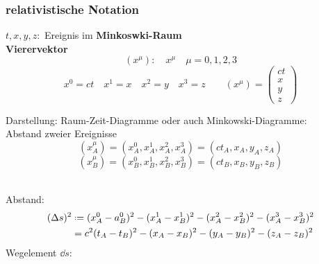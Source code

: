 \subsubsection{relativistische Notation}

$ t, x, y, z : $ Ereignis im \textbf{Minkoswki-Raum}\\[5pt]
\textbf{Vierervektor}
\begin{equation*}
\left(x^\mu\right): \quad x^\mu \quad \mu = 0, 1, 2, 3
\end{equation*}
\begin{equation*}
x^0 = ct \quad x^1 = x \quad x^2 = y \quad x^3 = z \qquad (x^\mu) = \begin{pmatrix}
ct \\ x \\ y \\ z
\end{pmatrix}
\end{equation*}
\begin{minipage}{.7\linewidth}
	Darstellung: Raum-Zeit-Diagramme oder auch Minkowski-Diagramme:\\[10pt]
	Abstand zweier Ereignisse
	\begin{equation*}
	(x_A^\mu) = (x_A^0 , x_A^1, x_A^2, x_A^3) = (ct_A, x_A, y_A, z_A)
	\end{equation*}
	\begin{equation*}
	(x_B^\mu) = (x_B^0 , x_B^1, x_B^2, x_B^3) = (ct_B, x_B, y_B, z_B)
	\end{equation*}
\end{minipage}%
\begin{minipage}{.3\linewidth}
	\flushright
\end{minipage}%
\\
Abstand:
\begin{align*}
(\Delta s)^2 &\defeq (x_A^0 - a_B^0)^2 - (x_A^1 - x_B^1)^2 - (x_A^2 - x_B^2)^2 - (x_A^3 - x_B^3)^2\\
&= c^2 (t_A - t_B)^2 - (x_A - x_B)^2 - (y_A - y_B)^2 - (z_A - z_B)^2
\end{align*}
Wegelement $ \dd s $:
